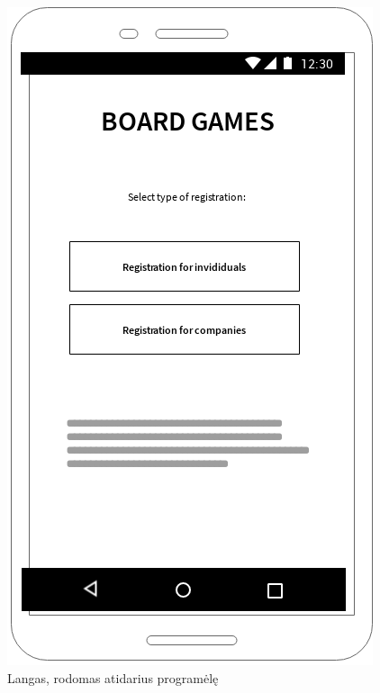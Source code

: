 \documentclass{VUMIFPSkursinis}
\begin{document}
\begin{figure}[H]
	\centering
	\includegraphics[scale=0.9]{img/entrance_window}
	\caption{Langas, rodomas atidarius programėlę}
	\label{img:entrance_window}
\end{figure}
\end{document}
